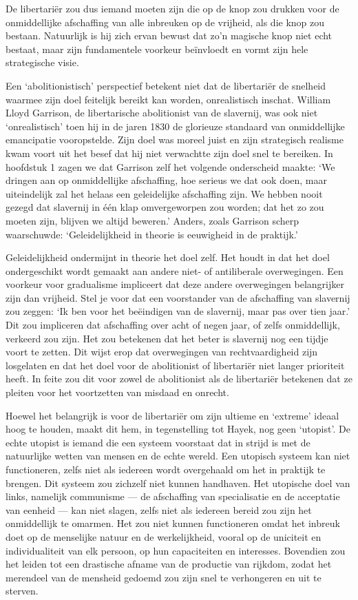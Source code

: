 \documentclass[
  a5paper,
  smalldemyvopaper,10pt,twoside,onecolumn,openright,extrafontsizes,hidelinks]{memoir}
\begin{document}
De libertariër zou dus iemand moeten zijn die op de knop zou drukken
voor de onmiddellijke afschaffing van alle inbreuken op de vrijheid, als
die knop zou bestaan. Natuurlijk is hij zich ervan bewust dat zo'n
magische knop niet echt bestaat, maar zijn fundamentele voorkeur
beïnvloedt en vormt zijn hele strategische visie.

Een `abolitionistisch' perspectief betekent niet dat de libertariër de
snelheid waarmee zijn doel feitelijk bereikt kan worden, onrealistisch
inschat. William Lloyd Garrison, de libertarische abolitionist van de
slavernij, was ook niet `onrealistisch' toen hij in de jaren 1830 de
glorieuze standaard van onmiddellijke emancipatie vooropstelde. Zijn
doel was moreel juist en zijn strategisch realisme kwam voort uit het
besef dat hij niet verwachtte zijn doel snel te bereiken. In hoofdstuk 1
zagen we dat Garrison zelf het volgende onderscheid maakte: `We dringen
aan op onmiddellijke afschaffing, hoe serieus we dat ook doen, maar
uiteindelijk zal het helaas een geleidelijke afschaffing zijn. We hebben
nooit gezegd dat slavernij in één klap omvergeworpen zou worden; dat het
zo zou moeten zijn, blijven we altijd beweren.' Anders, zoals Garrison
scherp waarschuwde: `Geleidelijkheid in theorie is eeuwigheid in de
praktijk.'

Geleidelijkheid ondermijnt in theorie het doel zelf. Het houdt in dat
het doel ondergeschikt wordt gemaakt aan andere niet- of antiliberale
overwegingen. Een voorkeur voor gradualisme impliceert dat deze andere
overwegingen belangrijker zijn dan vrijheid. Stel je voor dat een
voorstander van de afschaffing van slavernij zou zeggen: `Ik ben voor
het beëindigen van de slavernij, maar pas over tien jaar.' Dit zou
impliceren dat afschaffing over acht of negen jaar, of zelfs
onmiddellijk, verkeerd zou zijn. Het zou betekenen dat het beter is
slavernij nog een tijdje voort te zetten. Dit wijst erop dat
overwegingen van rechtvaardigheid zijn losgelaten en dat het doel voor
de abolitionist of libertariër niet langer prioriteit heeft. In feite
zou dit voor zowel de abolitionist als de libertariër betekenen dat ze
pleiten voor het voortzetten van misdaad en onrecht.

Hoewel het belangrijk is voor de libertariër om zijn ultieme en
`extreme' ideaal hoog te houden, maakt dit hem, in tegenstelling tot
Hayek, nog geen `utopist'. De echte utopist is iemand die een systeem
voorstaat dat in strijd is met de natuurlijke wetten van mensen en de
echte wereld. Een utopisch systeem kan niet functioneren, zelfs niet als
iedereen wordt overgehaald om het in praktijk te brengen. Dit systeem
zou zichzelf niet kunnen handhaven. Het utopische doel van links,
namelijk communisme --- de afschaffing van specialisatie en de
acceptatie van eenheid --- kan niet slagen, zelfs niet als iedereen
bereid zou zijn het onmiddellijk te omarmen. Het zou niet kunnen
functioneren omdat het inbreuk doet op de menselijke natuur en de
werkelijkheid, vooral op de uniciteit en individualiteit van elk
persoon, op hun capaciteiten en interesses. Bovendien zou het leiden tot
een drastische afname van de productie van rijkdom, zodat het merendeel
van de mensheid gedoemd zou zijn snel te verhongeren en uit te sterven.
\end{document}
